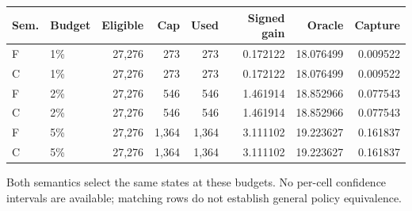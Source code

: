 \begin{center}
\begin{minipage}{\linewidth}
\centering\small
\setlength{\tabcolsep}{3pt}
\label{tab:voc-r3-sparse}
\begin{tabular}{llrrrrrr}
\toprule
Sem. & Budget & Eligible & Cap & Used & Signed gain & Oracle & Capture \\
\midrule
F & 1\% & 27,276 & 273 & 273 & 0.172122 & 18.076499 & 0.009522 \\
C & 1\% & 27,276 & 273 & 273 & 0.172122 & 18.076499 & 0.009522 \\
F & 2\% & 27,276 & 546 & 546 & 1.461914 & 18.852966 & 0.077543 \\
C & 2\% & 27,276 & 546 & 546 & 1.461914 & 18.852966 & 0.077543 \\
F & 5\% & 27,276 & 1,364 & 1,364 & 3.111102 & 19.223627 & 0.161837 \\
C & 5\% & 27,276 & 1,364 & 1,364 & 3.111102 & 19.223627 & 0.161837 \\
\bottomrule
\end{tabular}
\par\smallskip\raggedright\footnotesize
Both semantics select the same states at these budgets. No per-cell confidence intervals are available; matching rows do not establish general policy equivalence.
\end{minipage}
\end{center}
